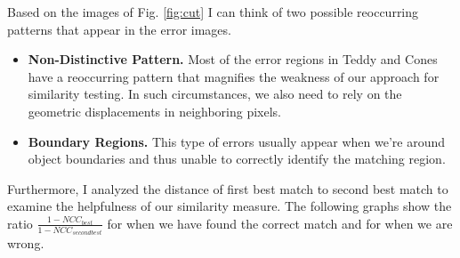 \documentclass[letterpaper,12pt]{article}
\begin{document}
Based on the images of Fig. \ref{fig:cut} I can think of two possible reoccurring patterns that appear in the error images.

\begin{itemize}
	\item \textbf{Non-Distinctive Pattern.} Most of the error regions in Teddy and Cones have a reoccurring pattern that magnifies the weakness of our approach for similarity testing. In such circumstances, we also need to rely on the geometric displacements in neighboring pixels.
	\item \textbf{Boundary Regions.} This type of errors usually appear when we're around object boundaries and thus unable to correctly identify the matching region.
\end{itemize}

Furthermore, I analyzed the distance of first best match to second best match to examine the helpfulness of our similarity measure. The following graphs show the ratio $\frac{1-NCC_{best}}{1-NCC_{second best}}$ for when we have found the correct match and for when we are wrong.
\end{document}
